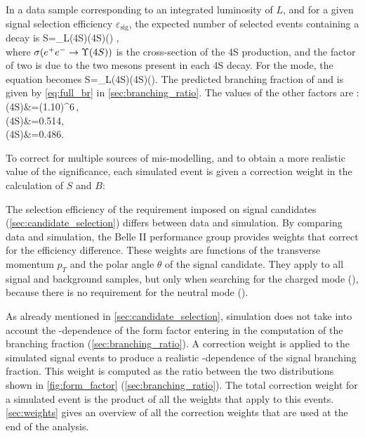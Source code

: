 In a data sample corresponding to an integrated luminosity of $L$, and for a given signal selection efficiency $\varepsilon_{\mathrm{sig}}$, the expected number of selected events containing a \BKpnn decay is 
\be \label{eq:Splus}
S=\varepsilon_{}\cdot L\cdot\sigma(\epem\to\Y4S)\cdot{}(\Y4S\to\BpBm)\cdot{}(\BKpnn) ,\\
\ee
where $\sigma(\epem\to\Y4S)$ is the cross-section of the \Y4S production, and the factor of two is due to the two \B mesons present in each \Y4S decay.
For the \BKznn mode, the equation becomes
\be \label{eq:Szero}
S=\varepsilon_{}\cdot L\cdot\sigma(\epem\to\Y4S)\cdot{}(\Y4S\to\BzBzb)\cdot{}(\BKznn).
\ee
The predicted branching fraction of \BKpnn and \BKznn is given by \cref{eq:full_br} in \cref{sec:branching_ratio}.
The values of the other factors are \cite{ParticleDataGroup:2020ssz,BaBar:2004rrm}: 
\ba
\sigma(\epem\to\Y4S)&=(1.10)^{6}\,\fb,\\
(\Y4S\to\BpBm)&=0.514,\\
(\Y4S\to\BzBzb)&=0.486.\\
\ea

To correct for multiple sources of mis-modelling, and to obtain a more realistic value of the significance, each simulated event is given a correction weight in the calculation of $S$ and $B$:
\bi
\item The selection efficiency of the \PID requirement imposed on signal \Kp candidates (\cref{sec:candidate_selection}) differs between data and simulation.
By comparing data and simulation, the Belle II performance group provides weights that correct for the efficiency difference.
These weights are functions of the transverse momentum $p_T$ and the polar angle $\theta$ of the signal \Kp candidate.
They apply to all signal and background samples, but only when searching for the charged mode (\BKpnn), because there is no \PID requirement for the neutral mode (\BKznn).
\item As already mentioned in \cref{sec:candidate_selection}, simulation does not take into account the \qq-dependence of the form factor entering in the computation of the \BKnn branching fraction (\cref{sec:branching_ratio}).
A correction weight is applied to the simulated signal events to produce a realistic \qq-dependence of the signal branching fraction.
This weight is computed as the ratio between the two distributions shown in \cref{fig:form_factor} (\cref{sec:branching_ratio}).
\ei
The total correction weight for a simulated event is the product of all the weights that apply to this events.
\cref{sec:weights} gives an overview of all the correction weights that are used at the end of the analysis. 

